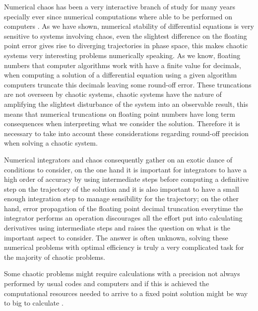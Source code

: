 Numerical chaos has been a very interactive branch of study for many years specially ever since numerical computations where able to be performed on computers . As we have shown, numerical stability of differential equations is very sensitive to systems involving chaos, even the slightest difference on the floating point error gives rise to diverging trajectories in phase space, this makes chaotic systems very interesting problems numerically speaking. As we know, floating numbers that computer algorithms work with have a finite value for decimals, when computing a solution of a differential equation using a given algorithm computers truncate this decimals leaving some round-off error. These truncations are not overseen by chaotic systems, chaotic systems have the nature of amplifying the slightest disturbance of the system into an observable result, this means that numerical truncations on floating point numbers have long term consequences when interpreting what we consider the solution. Therefore it is necessary to take into account these considerations regarding round-off precision when solving a chaotic system.\par

Numerical integrators and chaos consequently gather on an exotic dance of conditions to consider, on the one hand it is important for integrators to have a high order of accuracy by using intermediate steps before computing a definitive step on the trajectory of the solution and it is also important to have a small enough integration step to manage sensibility for the trajectory; on the other hand, error propagation of the floating point decimal truncation everytime the integrator performs an operation discourages all the effort put into calculating derivatives using intermediate steps and raises the question on what is the important aspect to consider. The answer is often unknown, solving these numerical problems with optimal efficiency is truly a very complicated task for the majority of chaotic problems\cite{lozi2013can}.\par 

Some chaotic problems might require calculations with a precision not always performed by usual codes and computers and if this is achieved the computational resources needed to arrive to a fixed point solution might be way to big to calculate \cite{galias2016numerical}.\par 

